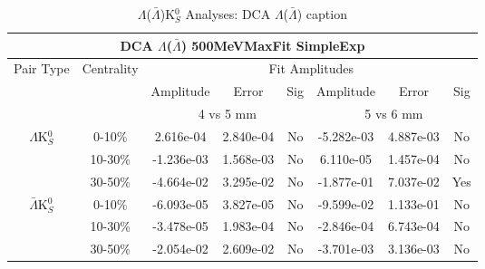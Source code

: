 \documentclass[../AnalysisNoteJBuxton.tex]{subfiles}
\begin{document}
\begin{table}
 \centering
 \begin{tabular}{|c|c|c|c|c||c|c|c|}
  \multicolumn{8}{c}{DCA $\Lambda$($\bar{\Lambda}$) 500MeVMaxFit SimpleExp} \\
  \hline
  \multirow{3}{*}{Pair Type} & \multirow{3}{*}{Centrality} & \multicolumn{6}{c|}{Fit Amplitudes} \\
  \cline{3-8}
   & & Amplitude & Error & Sig & Amplitude & Error & Sig \\
  \cline{3-8}
   & & \multicolumn{3}{c||}{4 vs 5 mm} & \multicolumn{3}{c|}{5 vs 6 mm} \\
  \hline  
  \multirow{3}{*}{$\Lambda$K$^{0}_{S}$}  
   &  0-10\% & 2.616e-04 & 2.840e-04 & No & -5.282e-03 & 4.887e-03 & No \\
   & 10-30\% & -1.236e-03 & 1.568e-03 & No & 6.110e-05 & 1.457e-04 & No \\
   & 30-50\% & -4.664e-02 & 3.295e-02 & No & -1.877e-01 & 7.037e-02 & Yes \\
  \hline  
  \multirow{3}{*}{$\bar{\Lambda}$K$^{0}_{S}$}  
   &  0-10\% & -6.093e-05 & 3.827e-05 & No & -9.599e-02 & 1.133e-01 & No \\
   & 10-30\% & -3.478e-05 & 1.983e-04 & No & -2.846e-04 & 6.743e-04 & No \\
   & 30-50\% & -2.054e-02 & 2.609e-02 & No & -3.701e-03 & 3.136e-03 & No \\
  \hline
 \end{tabular}
 \caption{$\Lambda$($\bar{\Lambda}$)K$^{0}_{S}$ Analyses: DCA $\Lambda$($\bar{\Lambda}$) caption}
 \label{tab:LamDcaLamK0_500MeVMaxFit_SimpleExp}
\end{table}

\end{document}
